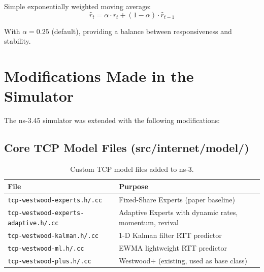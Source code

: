 \documentclass[12pt,a4paper]{article}
\begin{document}
Simple exponentially weighted moving average:
\begin{equation}
    \hat{r}_t = \alpha \cdot r_t + (1 - \alpha) \cdot \hat{r}_{t-1}
\end{equation}

With $\alpha = 0.25$ (default), providing a balance between responsiveness and stability.

\section{Modifications Made in the Simulator}
\label{sec:modifications}

The ns-3.45 simulator was extended with the following modifications:

\subsection{Core TCP Model Files (src/internet/model/)}

\begin{table}[H]
\centering
\caption{Custom TCP model files added to ns-3.}
\label{tab:tcp_files}
\small
\begin{tabularx}{\textwidth}{l X}
\toprule
\textbf{File} & \textbf{Purpose} \\
\midrule
\texttt{tcp-westwood-experts.h/.cc} & Fixed-Share Experts (paper baseline) \\
\texttt{tcp-westwood-experts-adaptive.h/.cc} & Adaptive Experts with dynamic rates, momentum, revival \\
\texttt{tcp-westwood-kalman.h/.cc} & 1-D Kalman filter RTT predictor \\
\texttt{tcp-westwood-ml.h/.cc} & EWMA lightweight RTT predictor \\
\texttt{tcp-westwood-plus.h/.cc} & Westwood+ (existing, used as base class) \\
\bottomrule
\end{tabularx}
\end{table}
\end{document}
